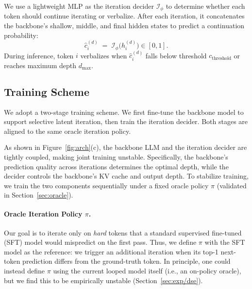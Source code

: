 We use a lightweight MLP as the iteration decider $\mathcal{I}_\phi$ to determine whether each token should continue iterating or verbalize.
After each iteration, it concatenates the backbone's shallow, middle, and final hidden states to predict a continuation probability:
\[
\hat{c}_i^{(d)} \;=\; \mathcal{I}_\phi\!\big(h_i^{(d)}\big) \in [0,1].
\]
During inference, token $i$ verbalizes when $\hat{c}_i^{(d)}$ falls below threshold $c_{\text{threshold}}$ or reaches maximum depth $d_{\max}$.

\subsection{Training Scheme}
\label{sec:training}

We adopt a two-stage training scheme. We first fine-tune the backbone model to support selective latent iteration, then train the iteration decider. Both stages are aligned to the same oracle iteration policy.

As shown in Figure~\ref{fig:arch}(c), the backbone LLM and the iteration decider are tightly coupled, making joint training unstable.
Specifically, the backbone’s prediction quality across iterations determines the optimal depth, while the decider controls the backbone’s KV cache and output depth. 
To stabilize training, we train the two components sequentially under a fixed oracle policy $\pi$ (validated in Section~\ref{sec:oracle}).

\paragraph{Oracle Iteration Policy $\pi$.}
Our goal is to iterate only on \emph{hard} tokens that a standard supervised fine-tuned (SFT) model would mispredict on the first pass.
Thus, we define $\pi$ with the SFT model as the reference: we trigger an additional iteration when its top-1 next-token prediction differs from the ground-truth token.
In principle, one could instead define $\pi$ using the current looped model itself (i.e., an on-policy oracle), but we find this to be empirically unstable (Section~\ref{sec:exp/dse}).


